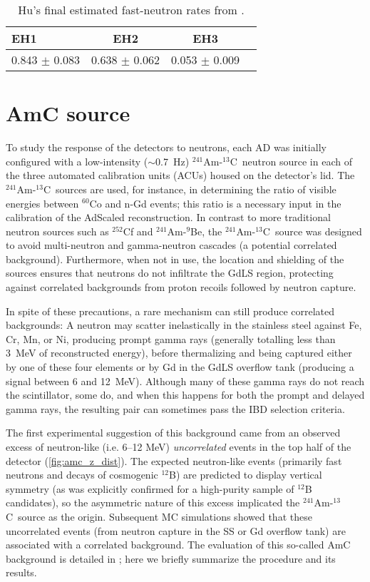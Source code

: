 \documentclass[../thesis.tex]{subfiles}
\begin{document}
\begin{table}[ht]
  \begin{tabular}{lccc}
    \toprule
    EH1 & EH2 & EH3 \\
    \midrule
    0.843 $\pm$ 0.083 & 0.638 $\pm$ 0.062 & 0.053 $\pm$ 0.009 \\
    \bottomrule
  \end{tabular}
  \caption{Hu's final estimated fast-neutron rates from \cite{fastn}.}
  \label{tab:bkgFastnFinalRates}
\end{table}

\newcommand\AmC{$^{241}$Am-$^{13}$C}

\section{AmC source}
\label{sec:bkgAmC}

To study the response of the detectors to neutrons, each AD was initially configured with a low-intensity ($\sim$0.7~Hz) \AmC\ neutron source in each of the three automated calibration units (ACUs) housed on the detector's lid. The \AmC\ sources are used, for instance, in determining the ratio of visible energies between $^{60}$Co and n-Gd events; this ratio is a necessary input in the calibration of the AdScaled reconstruction. In contrast to more traditional neutron sources such as $^{252}$Cf and $^{241}$Am-$^{9}$Be, the \AmC\ source was designed to avoid multi-neutron and gamma-neutron cascades (a potential correlated background). Furthermore, when not in use, the location and shielding of the sources ensures that neutrons do not infiltrate the GdLS region, protecting against correlated backgrounds from proton recoils followed by neutron capture.

In spite of these precautions, a rare mechanism can still produce correlated backgrounds: A neutron may scatter inelastically in the stainless steel against Fe, Cr, Mn, or Ni, producing prompt gamma rays (generally totalling less than 3~MeV of reconstructed energy), before thermalizing and being captured either by one of these four elements or by Gd in the GdLS overflow tank (producing a signal between 6 and 12~MeV). Although many of these gamma rays do not reach the scintillator, some do, and when this happens for both the prompt and delayed gamma rays, the resulting pair can sometimes pass the IBD selection criteria.

The first experimental suggestion of this background came from an observed excess of neutron-like (i.e. 6--12 MeV) \emph{uncorrelated} events in the top half of the detector (\autoref{fig:amc_z_dist}). The expected neutron-like events (primarily fast neutrons and decays of cosmogenic $^{12}$B) are predicted to display vertical symmetry (as was explicitly confirmed for a high-purity sample of $^{12}$B candidates), so the asymmetric nature of this excess implicated the \AmC\ source as the origin. Subsequent MC simulations showed that these uncorrelated events (from neutron capture in the SS or Gd overflow tank) are associated with a correlated background. The evaluation of this so-called AmC background is detailed in \cite{Gu_2016}; here we briefly summarize the procedure and its results.
\end{document}
